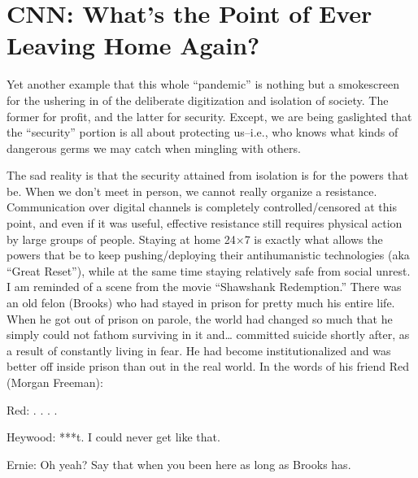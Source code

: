\chapter{CNN: What's the Point of Ever Leaving Home Again?}

\begin{refsection}

Yet another example that this whole \enquote{pandemic} is nothing but a smokescreen for the ushering in of the deliberate digitization and isolation of society. The former for profit, and the latter for security. Except, we are being gaslighted that the \enquote{security} portion is all about protecting us--i.e., who knows what kinds of dangerous germs we may catch when mingling with others.

The sad reality is that the security attained from isolation is for the powers that be. When we don't meet in person, we cannot really organize a resistance. Communication over digital channels is completely controlled/censored at this point, and even if it was useful, effective resistance still requires physical action by large groups of people. Staying at home 24$\times$7 is exactly what allows the powers that be to keep pushing/deploying their antihumanistic technologies (aka \enquote{Great Reset}), while at the same time staying relatively safe from social unrest. I am reminded of a scene from the movie \enquote{Shawshank Redemption.} There was an old felon (Brooks) who had stayed in prison for pretty much his entire life. When he got out of prison on parole, the world had changed so much that he simply could not fathom surviving in it and\dots{} committed suicide shortly after, as a result of constantly living in fear. He had become institutionalized and was better off inside prison than out in the real world. In the words of his friend Red (Morgan Freeman):

\begin{tcolorbox}[quote]

Red: . . . .

Heywood: ***t. I could never get like that.

Ernie: Oh yeah? Say that when you been here as long as Brooks has.


\end{tcolorbox}
\end{refsection}
